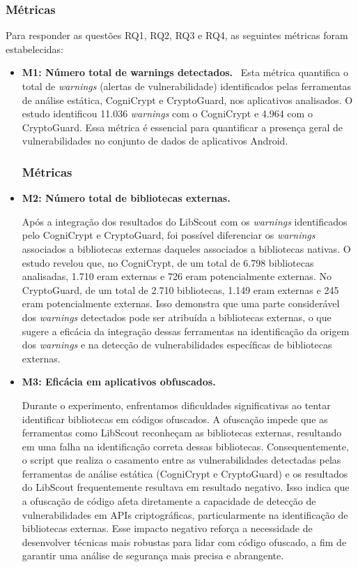 \subsubsection{Métricas}
Para responder as questões RQ1, RQ2, RQ3 e RQ4, as seguintes métricas foram estabelecidas:

\begin{itemize}
\item \textbf{M1: Número total de warnings detectados.} \
Esta métrica quantifica o total de \textit{warnings} (alertas de vulnerabilidade) identificados pelas ferramentas de análise estática, CogniCrypt e CryptoGuard, nos aplicativos analisados. O estudo identificou 11.036 \textit{warnings} com o CogniCrypt e 4.964 com o CryptoGuard. Essa métrica é essencial para quantificar a presença geral de vulnerabilidades no conjunto de dados de aplicativos Android.
\subsubsection{Métricas}

\item \textbf{M2: Número total de bibliotecas externas.} \

Após a integração dos resultados do LibScout com os \textit{warnings} identificados pelo CogniCrypt e CryptoGuard, foi possível diferenciar os \textit{warnings} associados a bibliotecas externas daqueles associados a bibliotecas nativas. O estudo revelou que, no CogniCrypt, de um total de 6.798 bibliotecas analisadas, 1.710 eram externas e 726 eram potencialmente externas. No CryptoGuard, de um total de 2.710 bibliotecas, 1.149 eram externas e 245 eram potencialmente externas. Isso demonstra que uma parte considerável dos \textit{warnings} detectados pode ser atribuída a bibliotecas externas, o que sugere a eficácia da integração dessas ferramentas na identificação da origem dos \textit{warnings} e na detecção de vulnerabilidades específicas de bibliotecas externas.

\item \textbf{M3: Eficácia em aplicativos obfuscados.} \

Durante o experimento, enfrentamos dificuldades significativas ao tentar identificar bibliotecas em códigos ofuscados. A ofuscação impede que as ferramentas como LibScout reconheçam as bibliotecas externas, resultando em uma falha na identificação correta dessas bibliotecas. Consequentemente, o script que realiza o casamento entre as vulnerabilidades detectadas pelas ferramentas de análise estática (CogniCrypt e CryptoGuard) e os resultados do LibScout frequentemente resultava em resultado negativo. Isso indica que a ofuscação de código afeta diretamente a capacidade de detecção de vulnerabilidades em APIs criptográficas, particularmente na identificação de bibliotecas externas. Esse impacto negativo reforça a necessidade de desenvolver técnicas mais robustas para lidar com código ofuscado, a fim de garantir uma análise de segurança mais precisa e abrangente.

\end{itemize}

